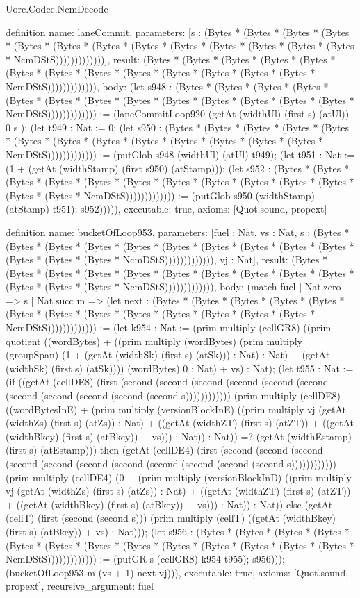 \begin{lexlean}{Uorc.Codec.NcmDecode}
\begin{semanticmodule}
definition{
  name: laneCommit,
  parameters: [s : (Bytes * (Bytes * (Bytes * (Bytes * (Bytes * (Bytes * (Bytes * (Bytes * (Bytes * (Bytes * (Bytes * (Bytes * (Bytes * NcmDStS)))))))))))))],
  result: (Bytes * (Bytes * (Bytes * (Bytes * (Bytes * (Bytes * (Bytes * (Bytes * (Bytes * (Bytes * (Bytes * (Bytes * (Bytes * NcmDStS))))))))))))),
  body: (let s948 : (Bytes * (Bytes * (Bytes * (Bytes * (Bytes * (Bytes * (Bytes * (Bytes * (Bytes * (Bytes * (Bytes * (Bytes * (Bytes * NcmDStS))))))))))))) := (laneCommitLoop920 (getAt (widthUl) (first s) (atUl)) 0 s ); (let t949 : Nat := 0; (let s950 : (Bytes * (Bytes * (Bytes * (Bytes * (Bytes * (Bytes * (Bytes * (Bytes * (Bytes * (Bytes * (Bytes * (Bytes * (Bytes * NcmDStS))))))))))))) := (putGlob s948 (widthUl) (atUl) t949); (let t951 : Nat := (1 + (getAt (widthStamp) (first s950) (atStamp))); (let s952 : (Bytes * (Bytes * (Bytes * (Bytes * (Bytes * (Bytes * (Bytes * (Bytes * (Bytes * (Bytes * (Bytes * (Bytes * (Bytes * NcmDStS))))))))))))) := (putGlob s950 (widthStamp) (atStamp) t951); s952))))),
  executable: true,
  axioms: [Quot.sound, propext]
}

definition{
  name: bucketOfLoop953,
  parameters: [fuel : Nat, vs : Nat, s : (Bytes * (Bytes * (Bytes * (Bytes * (Bytes * (Bytes * (Bytes * (Bytes * (Bytes * (Bytes * (Bytes * (Bytes * (Bytes * NcmDStS))))))))))))), vj : Nat],
  result: (Bytes * (Bytes * (Bytes * (Bytes * (Bytes * (Bytes * (Bytes * (Bytes * (Bytes * (Bytes * (Bytes * (Bytes * (Bytes * NcmDStS))))))))))))),
  body: (match fuel
    | Nat.zero => s
    | Nat.succ m => (let next : (Bytes * (Bytes * (Bytes * (Bytes * (Bytes * (Bytes * (Bytes * (Bytes * (Bytes * (Bytes * (Bytes * (Bytes * (Bytes * NcmDStS))))))))))))) := (let k954 : Nat := (prim multiply (cellGR8) ((prim quotient ((wordBytes) + ((prim multiply (wordBytes) (prim multiply (groupSpan) (1 + (getAt (widthSk) (first s) (atSk))) : Nat) : Nat) + (getAt (widthSk) (first s) (atSk)))) (wordBytes) 0 : Nat) + vs) : Nat); (let t955 : Nat := (if ((getAt (cellDE8) (first (second (second (second (second (second (second (second (second (second (second (second s)))))))))))) (prim multiply (cellDE8) ((wordBytesInE) + (prim multiply (versionBlockInE) ((prim multiply vj (getAt (widthZs) (first s) (atZs)) : Nat) + ((getAt (widthZT) (first s) (atZT)) + ((getAt (widthBkey) (first s) (atBkey)) + vs))) : Nat)) : Nat)) =? (getAt (widthEstamp) (first s) (atEstamp))) then (getAt (cellDE4) (first (second (second (second (second (second (second (second (second (second (second (second s)))))))))))) (prim multiply (cellDE4) (0 + (prim multiply (versionBlockInD) ((prim multiply vj (getAt (widthZs) (first s) (atZs)) : Nat) + ((getAt (widthZT) (first s) (atZT)) + ((getAt (widthBkey) (first s) (atBkey)) + vs))) : Nat)) : Nat)) else (getAt (cellT) (first (second (second s))) (prim multiply (cellT) ((getAt (widthBkey) (first s) (atBkey)) + vs) : Nat))); (let s956 : (Bytes * (Bytes * (Bytes * (Bytes * (Bytes * (Bytes * (Bytes * (Bytes * (Bytes * (Bytes * (Bytes * (Bytes * (Bytes * NcmDStS))))))))))))) := (putGR s (cellGR8) k954 t955); s956))); (bucketOfLoop953 m (vs + 1) next vj))),
  executable: true,
  axioms: [Quot.sound, propext],
  recursive_argument: fuel
}


\end{semanticmodule}
\end{lexlean}
